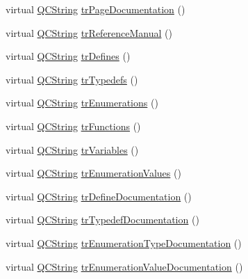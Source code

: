 \begin{DoxyCompactItemize}
\item 
virtual \mbox{\hyperlink{class_q_c_string}{Q\+C\+String}} \mbox{\hyperlink{class_translator_chinesetraditional_a994ce609d694ebc1b7fcd8bc8b578d02}{tr\+Page\+Documentation}} ()
\item 
virtual \mbox{\hyperlink{class_q_c_string}{Q\+C\+String}} \mbox{\hyperlink{class_translator_chinesetraditional_a226c40197d5f7a2afe8841eff0e5e210}{tr\+Reference\+Manual}} ()
\item 
virtual \mbox{\hyperlink{class_q_c_string}{Q\+C\+String}} \mbox{\hyperlink{class_translator_chinesetraditional_ade896d737b8e80dd3d5573be1c37ebce}{tr\+Defines}} ()
\item 
virtual \mbox{\hyperlink{class_q_c_string}{Q\+C\+String}} \mbox{\hyperlink{class_translator_chinesetraditional_ac2de12d719aed877943718f00ba68b9a}{tr\+Typedefs}} ()
\item 
virtual \mbox{\hyperlink{class_q_c_string}{Q\+C\+String}} \mbox{\hyperlink{class_translator_chinesetraditional_ac5d2459582f0db8bcc212d2d5aca954b}{tr\+Enumerations}} ()
\item 
virtual \mbox{\hyperlink{class_q_c_string}{Q\+C\+String}} \mbox{\hyperlink{class_translator_chinesetraditional_a8289959dba838e5c9796e564f760b193}{tr\+Functions}} ()
\item 
virtual \mbox{\hyperlink{class_q_c_string}{Q\+C\+String}} \mbox{\hyperlink{class_translator_chinesetraditional_af9364497af3826f519b7e5811e9e6a0d}{tr\+Variables}} ()
\item 
virtual \mbox{\hyperlink{class_q_c_string}{Q\+C\+String}} \mbox{\hyperlink{class_translator_chinesetraditional_aa7461e7db8825b28727eb0df9dfc1095}{tr\+Enumeration\+Values}} ()
\item 
virtual \mbox{\hyperlink{class_q_c_string}{Q\+C\+String}} \mbox{\hyperlink{class_translator_chinesetraditional_a51894f95d55c54f919a7066f2889b4be}{tr\+Define\+Documentation}} ()
\item 
virtual \mbox{\hyperlink{class_q_c_string}{Q\+C\+String}} \mbox{\hyperlink{class_translator_chinesetraditional_a6aaadc23c3996b49a87da3b5aa23e099}{tr\+Typedef\+Documentation}} ()
\item 
virtual \mbox{\hyperlink{class_q_c_string}{Q\+C\+String}} \mbox{\hyperlink{class_translator_chinesetraditional_aa761127e4fdb1b34969289831f7c817c}{tr\+Enumeration\+Type\+Documentation}} ()
\item 
virtual \mbox{\hyperlink{class_q_c_string}{Q\+C\+String}} \mbox{\hyperlink{class_translator_chinesetraditional_ab4f1b9601ba176651ff6aa46e9380fb0}{tr\+Enumeration\+Value\+Documentation}} ()

\end{DoxyCompactItemize}
